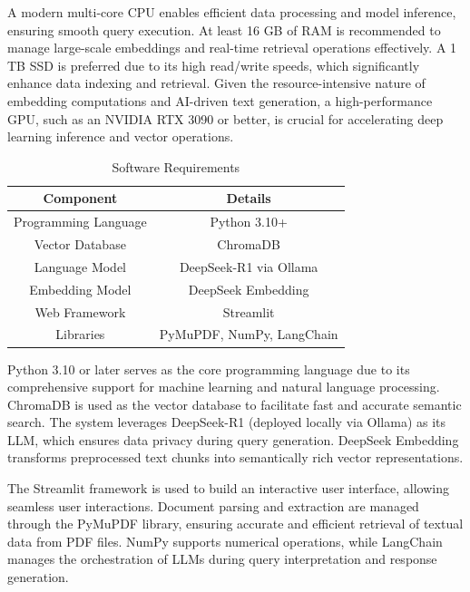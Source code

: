 \begin{refsection}
A modern multi-core CPU enables efficient data processing and model inference, ensuring smooth query execution. At least 16 GB of RAM is recommended to manage large-scale embeddings and real-time retrieval operations effectively. A 1 TB SSD is preferred due to its high read/write speeds, which significantly enhance data indexing and retrieval. Given the resource-intensive nature of embedding computations and AI-driven text generation, a high-performance GPU, such as an NVIDIA RTX 3090 or better, is crucial for accelerating deep learning inference and vector operations.


\begin{table} [!h]
\centering
\caption{Software Requirements}
\label{tab:software_requirements}
\begin{tabular}{|c|c|}
\hline
\textbf{Component} & \textbf{Details} \\
\hline
Programming Language & Python 3.10+ \\
Vector Database & ChromaDB \\
Language Model & DeepSeek-R1 via Ollama \\
Embedding Model & DeepSeek Embedding \\
Web Framework & Streamlit \\
Libraries & PyMuPDF, NumPy, LangChain \\
\hline
\end{tabular}
\end{table}

Python 3.10 or later serves as the core programming language due to its comprehensive support for machine learning and natural language processing. ChromaDB is used as the vector database to facilitate fast and accurate semantic search. The system leverages DeepSeek-R1 (deployed locally via Ollama) as its LLM, which ensures data privacy during query generation. DeepSeek Embedding transforms preprocessed text chunks into semantically rich vector representations.

The Streamlit framework is used to build an interactive user interface, allowing seamless user interactions. Document parsing and extraction are managed through the PyMuPDF library, ensuring accurate and efficient retrieval of textual data from PDF files. NumPy supports numerical operations, while LangChain manages the orchestration of LLMs during query interpretation and response generation.


\end{refsection}

